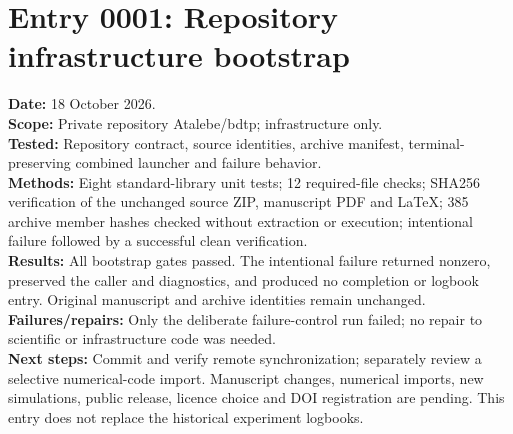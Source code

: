 \section*{Entry 0001: Repository infrastructure bootstrap}
\textbf{Date:} 18 October 2026.\\
\textbf{Scope:} Private repository Atalebe/bdtp; infrastructure only.\\
\textbf{Tested:} Repository contract, source identities, archive manifest,
terminal-preserving combined launcher and failure behavior.\\
\textbf{Methods:} Eight standard-library unit tests; 12 required-file checks;
SHA256 verification of the unchanged source ZIP, manuscript PDF and LaTeX;
385 archive member hashes checked without extraction or execution;
intentional failure followed by a successful clean verification.\\
\textbf{Results:} All bootstrap gates passed. The intentional failure returned
nonzero, preserved the caller and diagnostics, and produced no completion or
logbook entry. Original manuscript and archive identities remain unchanged.\\
\textbf{Failures/repairs:} Only the deliberate failure-control run failed;
no repair to scientific or infrastructure code was needed.\\
\textbf{Next steps:} Commit and verify remote synchronization; separately review
a selective numerical-code import. Manuscript changes, numerical imports,
new simulations, public release, licence choice and DOI registration are pending.
This entry does not replace the historical experiment logbooks.
